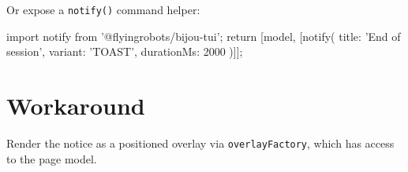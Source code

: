 Or expose a \texttt{n\allowbreak{}o\allowbreak{}t\allowbreak{}i\allowbreak{}f\allowbreak{}y\allowbreak{}(\allowbreak{})} command helper:

\begin{CodeBlock}
import { notify } from '@flyingrobots/bijou-tui';
return [model, [notify({ title: 'End of session', variant: 'TOAST', durationMs: 2000 })]];
\end{CodeBlock}

\section{Workaround}\label{record-350-workaround}

Render the notice as a positioned overlay via \texttt{o\allowbreak{}v\allowbreak{}e\allowbreak{}r\allowbreak{}l\allowbreak{}a\allowbreak{}y\allowbreak{}F\allowbreak{}a\allowbreak{}c\allowbreak{}t\allowbreak{}o\allowbreak{}r\allowbreak{}y}, which has access to the page model.

